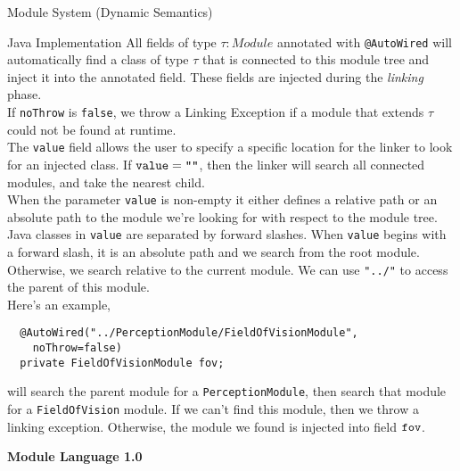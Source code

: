 \documentclass[11pt]{article}
\begin{document}
\begin{section}{Module System (Dynamic Semantics)}
\begin{subsection}{Java Implementation}
All fields of type $\tau : Module$ annotated with \verb|@AutoWired| will automatically find a class of type $\tau$ that is connected to this module tree and inject it into the annotated field. These fields are injected during the \emph{linking} phase.\\

If \verb|noThrow| is \verb|false|, we throw a Linking Exception if a module that extends $\tau$ could not be found at runtime. \\

The \verb|value| field allows the user to specify a specific location for the linker to look for an injected class. If $\verb|value| = \verb|""|$, then the linker will search all connected modules, and take the nearest child.\\

When the parameter \verb|value| is non-empty it either defines a relative path or an absolute path to the module we're looking for with respect to the module tree. Java classes in \verb|value| are separated by forward slashes. When \verb|value| begins with a forward slash, it is an absolute path and we search from the root module. Otherwise, we search relative to the current module. We can use \verb|"../"| to access the parent of this module. \\

Here's an example, 
\begin{verbatim}
  @AutoWired("../PerceptionModule/FieldOfVisionModule", 
    noThrow=false) 
  private FieldOfVisionModule fov;
\end{verbatim}
will search the parent module for a \verb|PerceptionModule|, then search that module for a \verb|FieldOfVision| module. If we can't find this module, then we throw a linking exception. Otherwise, the module we found is injected into field $\verb|fov|$.

\end{subsection}
\end{section}
\setcounter{section}{0}
\begin{center}\textbf{\LARGE Module Language 1.0} \end{center}
\end{document}
